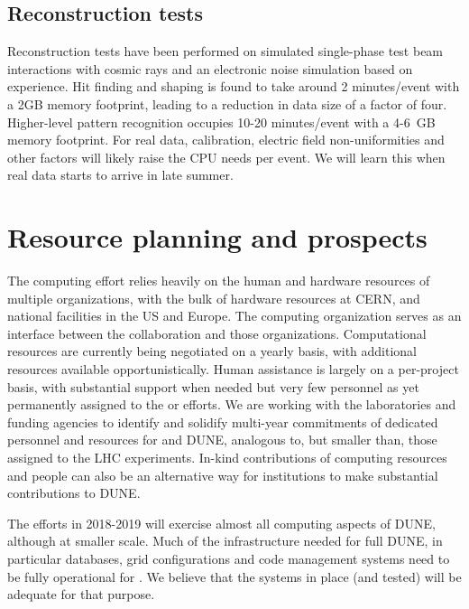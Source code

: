 \subsection{Reconstruction tests}
Reconstruction tests have been performed on simulated  single-phase  test beam interactions with cosmic rays and an electronic noise simulation based on  experience.  Hit finding and shaping is found to take around 2 minutes/event with a 2GB memory footprint, leading to a reduction in data size of a factor of four.  Higher-level pattern recognition occupies 10-20 minutes/event with a 4-6~GB memory footprint.  For real data, calibration, electric field non-uniformities and other factors will likely raise the CPU needs per event. We will learn this when real data starts to arrive in late summer. 


\section{Resource planning and prospects}



The   computing effort  relies heavily on the human and hardware resources of  multiple organizations,  with the bulk of hardware resources at CERN, and national facilities in the US and Europe.  The    computing organization serves as an interface between the collaboration and those organizations.  Computational resources are currently being negotiated on a yearly basis, with additional resources available opportunistically. Human assistance is largely on a per-project  basis, with substantial support when needed but very few personnel as yet permanently assigned to the   or  efforts.  We are working with the laboratories and funding agencies to identify and solidify multi-year commitments of dedicated personnel and resources for  and DUNE, analogous to, but smaller than, those assigned to the LHC experiments.   In-kind contributions of computing resources and people can also  be an alternative way for institutions to make substantial contributions to DUNE.

The  efforts in 2018-2019 will exercise almost all computing aspects of DUNE, although at smaller scale.  Much of the infrastructure needed for full DUNE, in particular  databases, grid configurations and code management systems need to be fully operational  for .   We believe that the systems in place (and tested) will be adequate for that purpose.

